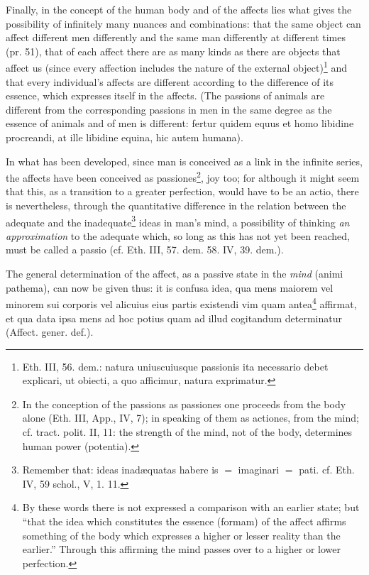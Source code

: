 \documentclass[12pt,a4paper,openany]{book}
\newcommand{\opage}[1]{\marginnote{\footnotesize\textit{[#1]}}}
\begin{document}
Finally, in the concept of the human body and of the affects
lies what gives the possibility of infinitely many
nuances and combinations: that the same object can
affect different men differently and the same
man differently at different times (pr. 51), that
of each affect there are as many kinds as there are objects
that affect us (since every affection includes the
nature of the external
object)\footnote{Eth. III, 56. dem.: natura uniuscuiusque
passionis ita necessario debet explicari, ut obiecti, a quo
afficimur, natura exprimatur.} and that every individual's affects
are different according to the difference of its essence, which expresses
itself in the affects. (The passions of animals are different
from the corresponding passions in men in the same
degree as the essence of animals and of men is different:
fertur quidem equus et homo libidine procreandi, at ille
libidine equina, hic autem humana).

\opage{119}\setcounter{footnote}{0}In what has been developed, since man is conceived as a link in
the infinite series, the affects have been conceived as
passiones\footnote{In the conception of the passions as passiones
one proceeds from the body alone (Eth. III, App., IV, 7); in
speaking of them as actiones, from the mind; cf. tract. polit. II,
11: the strength of the mind, not of the body, determines
human power (potentia).}, joy too; for although it might seem that this, %
as a transition to a greater perfection, would have to be
an actio, there is nevertheless, through the quantitative difference in
the relation between the adequate and the
inadequate\footnote{Remember that: ideas inadæquatas habere
is $=$ imaginari $=$ pati. cf. Eth. IV, 59 schol., V, 1. 11.} ideas in
man's mind, a possibility of thinking \emph{an approximation}
to the adequate which, so long as this has not yet
been reached, must be called a passio (cf. Eth. III, 57. dem.
58. IV, 39. dem.).

The general determination of the affect, as a passive
state in the \emph{mind} (animi pathema), can now be given thus:
it is
confusa idea, qua mens maiorem vel minorem
sui corporis vel alicuius eius partis existendi vim quam
antea\footnote{By these words there is not expressed a
comparison with an earlier state; but ``that the idea
which constitutes the essence (formam) of the affect affirms something of
the body which expresses a higher or lesser reality than
the earlier.'' Through this affirming the mind passes over to a
higher or lower perfection.} affirmat, et qua data ipsa mens ad hoc potius quam
ad illud cogitandum determinatur (Affect. gener. def.).
\end{document}
